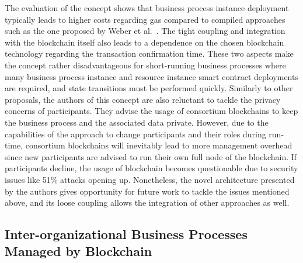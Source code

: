The evaluation of the concept shows that business process instance deployment typically leads to higher costs regarding gas compared to compiled approaches such as the one proposed by Weber et al.~\cite{untrusted_bp_execution_using_blockchain}. The tight coupling and integration with the blockchain itself also leads to a dependence on the chosen blockchain technology regarding the transaction confirmation time. These two aspects make the concept rather disadvantageous for short-running business processes where many business process instance and resource instance smart contract deployments are required, and state transitions must be performed quickly. Similarly to other proposals, the authors of this concept are also reluctant to tackle the privacy concerns of participants. They advise the usage of consortium blockchains to keep the business process and the associated data private. However, due to the capabilities of the approach to change participants and their roles during run-time, consortium blockchains will inevitably lead to more management overhead since new participants are advised to run their own full node of the blockchain. If participants decline, the usage of blockchain becomes questionable due to security issues like 51\% attacks opening up. Nonetheless, the novel architecture presented by the authors gives opportunity for future work to tackle the issues mentioned above, and its loose coupling allows the integration of other approaches as well.


\subsection{Inter-organizational Business Processes Managed by Blockchain~\cite{inter_organizational_bps_managed_by_blockchain}}
\label{sec:related-work:nakamura}

